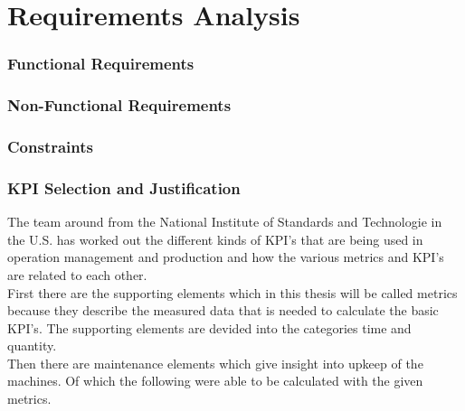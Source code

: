 \chapter{\textbf{Requirements Analysis}}\label{grundlagen}
\subsection{Functional Requirements} %
\subsection{Non-Functional Requirements} %
\subsection{Constraints} %
\subsection{KPI Selection and Justification}
The team around \cite{kangHierarchicalStructureKey2016} from the National Institute of Standards and Technologie in the U.S. has worked out the different kinds of KPI's that are being used in operation management and production and how the various metrics and KPI's are related to each other.
\\First there are the supporting elements which in this thesis will be called metrics because they describe the measured data that is needed to calculate the basic KPI's. The supporting elements are devided into the categories time and quantity.
\\Then there are maintenance elements which give insight into upkeep of the machines. Of which the following were able to be calculated with the given metrics.
\\